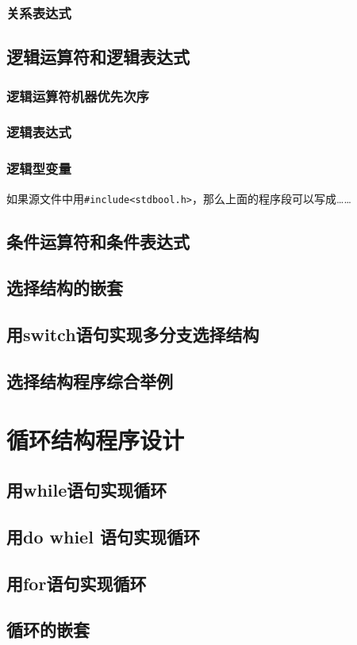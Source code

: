 \subsection{关系表达式}
\section{逻辑运算符和逻辑表达式}
\subsection{逻辑运算符机器优先次序}
\subsection{逻辑表达式}
\subsection{逻辑型变量}
如果源文件中用\verb|#include<stdbool.h>|，那么上面的程序段可以写成……
\section{条件运算符和条件表达式}
\section{选择结构的嵌套}
\section{用switch语句实现多分支选择结构}
\section{选择结构程序综合举例}

\chapter{循环结构程序设计}
\section{用while语句实现循环}
\section{用do whiel 语句实现循环}
\section{用for语句实现循环}
\section{循环的嵌套}
